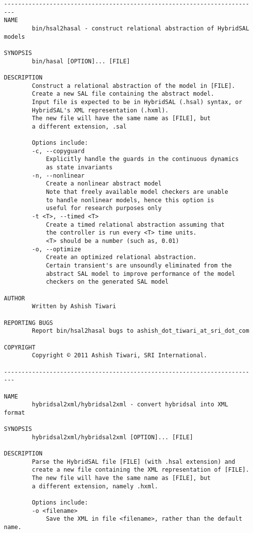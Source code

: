 \documentclass{llncs}
\begin{document}
\begin{verbatim}
-------------------------------------------------------------------------
NAME
        bin/hsal2hasal - construct relational abstraction of HybridSAL models

SYNOPSIS
        bin/hasal [OPTION]... [FILE]

DESCRIPTION
        Construct a relational abstraction of the model in [FILE].
        Create a new SAL file containing the abstract model.
        Input file is expected to be in HybridSAL (.hsal) syntax, or
        HybridSAL's XML representation (.hxml).
        The new file will have the same name as [FILE], but
        a different extension, .sal

        Options include:
        -c, --copyguard
            Explicitly handle the guards in the continuous dynamics
            as state invariants
        -n, --nonlinear
            Create a nonlinear abstract model
            Note that freely available model checkers are unable
            to handle nonlinear models, hence this option is 
            useful for research purposes only
        -t <T>, --timed <T>
            Create a timed relational abstraction assuming that
            the controller is run every <T> time units.
            <T> should be a number (such as, 0.01)
        -o, --optimize
            Create an optimized relational abstraction.
            Certain transient's are unsoundly eliminated from the
            abstract SAL model to improve performance of the model 
            checkers on the generated SAL model

AUTHOR
        Written by Ashish Tiwari

REPORTING BUGS
        Report bin/hsal2hasal bugs to ashish_dot_tiwari_at_sri_dot_com

COPYRIGHT
        Copyright © 2011 Ashish Tiwari, SRI International.

-------------------------------------------------------------------------

NAME
        hybridsal2xml/hybridsal2xml - convert hybridsal into XML format

SYNOPSIS
        hybridsal2xml/hybridsal2xml [OPTION]... [FILE]

DESCRIPTION
        Parse the HybridSAL file [FILE] (with .hsal extension) and
        create a new file containing the XML representation of [FILE].
        The new file will have the same name as [FILE], but
        a different extension, namely .hxml.

        Options include:
        -o <filename>
            Save the XML in file <filename>, rather than the default name.


\end{verbatim}
\end{document}
